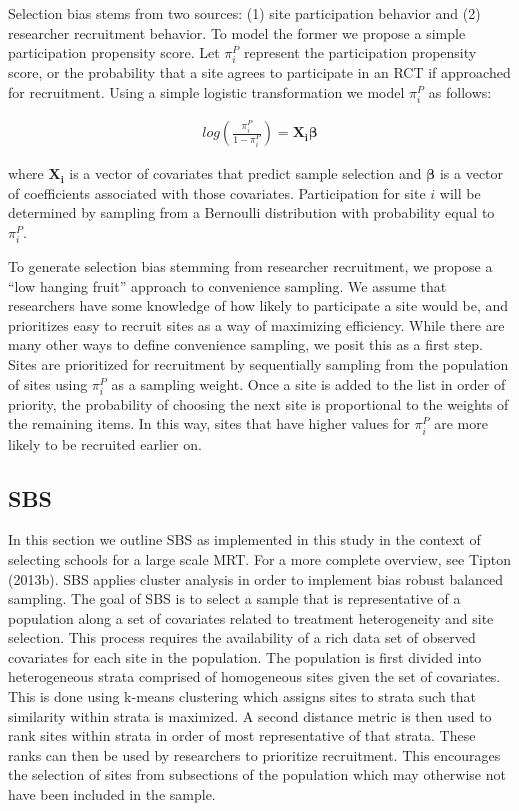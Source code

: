 \documentclass[man,floatsintext]{apa6}
\theoremstyle{definition}
\theoremstyle{definition}
\theoremstyle{definition}
\theoremstyle{remark}
\begin{document}
Selection bias stems from two sources: (1) site participation behavior
and (2) researcher recruitment behavior. To model the former we propose
a simple participation propensity score. Let \(\pi^P_i\) represent the
participation propensity score, or the probability that a site agrees to
participate in an RCT if approached for recruitment. Using a simple
logistic transformation we model \(\pi^P_i\) as follows:

\begin{align}
  log(\frac{\pi^P_i}{1 - \pi^P_i}) = \boldsymbol{X_i \beta}
\end{align}

where \(\boldsymbol{X_i}\) is a vector of covariates that predict sample
selection and \(\boldsymbol{\beta}\) is a vector of coefficients
associated with those covariates. Participation for site \(i\) will be
determined by sampling from a Bernoulli distribution with probability
equal to \(\pi^P_i\).

To generate selection bias stemming from researcher recruitment, we
propose a \enquote{low hanging fruit} approach to convenience sampling.
We assume that researchers have some knowledge of how likely to
participate a site would be, and prioritizes easy to recruit sites as a
way of maximizing efficiency. While there are many other ways to define
convenience sampling, we posit this as a first step. Sites are
prioritized for recruitment by sequentially sampling from the population
of sites using \(\pi^P_i\) as a sampling weight. Once a site is added to
the list in order of priority, the probability of choosing the next site
is proportional to the weights of the remaining items. In this way,
sites that have higher values for \(\pi^P_i\) are more likely to be
recruited earlier on.

\hypertarget{sbs}{%
\subsection{SBS}\label{sbs}}

In this section we outline SBS as implemented in this study in the
context of selecting schools for a large scale MRT. For a more complete
overview, see Tipton (2013b). SBS applies cluster analysis in order to
implement bias robust balanced sampling. The goal of SBS is to select a
sample that is representative of a population along a set of covariates
related to treatment heterogeneity and site selection. This process
requires the availability of a rich data set of observed covariates for
each site in the population. The population is first divided into
heterogeneous strata comprised of homogeneous sites given the set of
covariates. This is done using k-means clustering which assigns sites to
strata such that similarity within strata is maximized. A second
distance metric is then used to rank sites within strata in order of
most representative of that strata. These ranks can then be used by
researchers to prioritize recruitment. This encourages the selection of
sites from subsections of the population which may otherwise not have
been included in the sample.
\end{document}
